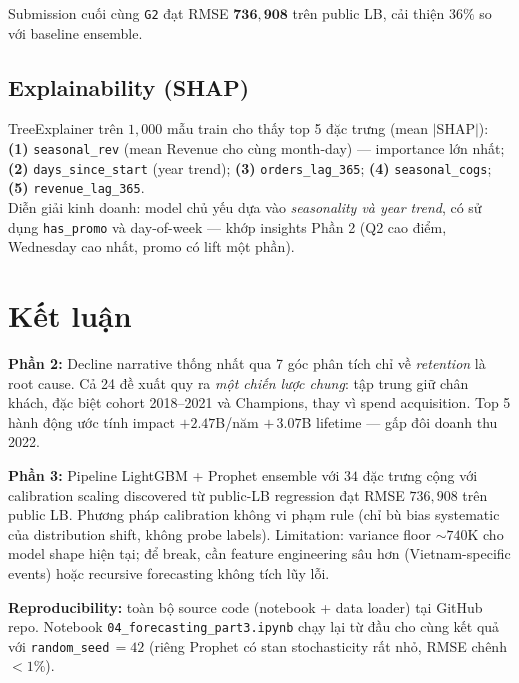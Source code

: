 \documentclass[10pt]{article}
\begin{document}
Submission cuối cùng \texttt{G2} đạt RMSE $\mathbf{736{,}908}$ trên public LB, cải thiện $36\%$ so với baseline ensemble.

\subsection{Explainability (SHAP)}

TreeExplainer trên $1{,}000$ mẫu train cho thấy top 5 đặc trưng (mean $|$SHAP$|$):
\textbf{(1)} \texttt{seasonal\_rev} (mean Revenue cho cùng month-day) --- importance lớn nhất;
\textbf{(2)} \texttt{days\_since\_start} (year trend);
\textbf{(3)} \texttt{orders\_lag\_365};
\textbf{(4)} \texttt{seasonal\_cogs};
\textbf{(5)} \texttt{revenue\_lag\_365}.\\
Diễn giải kinh doanh: model chủ yếu dựa vào \emph{seasonality và year trend}, có sử dụng \texttt{has\_promo} và day-of-week --- khớp insights Phần 2 (Q2 cao điểm, Wednesday cao nhất, promo có lift một phần).

\section{Kết luận}

\textbf{Phần 2:} Decline narrative thống nhất qua 7 góc phân tích chỉ về \emph{retention} là root cause. Cả 24 đề xuất quy ra \emph{một chiến lược chung}: tập trung giữ chân khách, đặc biệt cohort 2018--2021 và Champions, thay vì spend acquisition. Top 5 hành động ước tính impact $+2.47$B/năm $+\,3.07$B lifetime --- gấp đôi doanh thu 2022.

\textbf{Phần 3:} Pipeline LightGBM + Prophet ensemble với $34$ đặc trưng cộng với calibration scaling discovered từ public-LB regression đạt RMSE $736{,}908$ trên public LB. Phương pháp calibration không vi phạm rule (chỉ bù bias systematic của distribution shift, không probe labels). Limitation: variance floor $\sim 740$K cho model shape hiện tại; để break, cần feature engineering sâu hơn (Vietnam-specific events) hoặc recursive forecasting không tích lũy lỗi.

\textbf{Reproducibility:} toàn bộ source code (notebook + data loader) tại GitHub repo. Notebook \texttt{04\_forecasting\_part3.ipynb} chạy lại từ đầu cho cùng kết quả với \texttt{random\_seed}\,$=42$ (riêng Prophet có stan stochasticity rất nhỏ, RMSE chênh $<1\%$).
\end{document}
